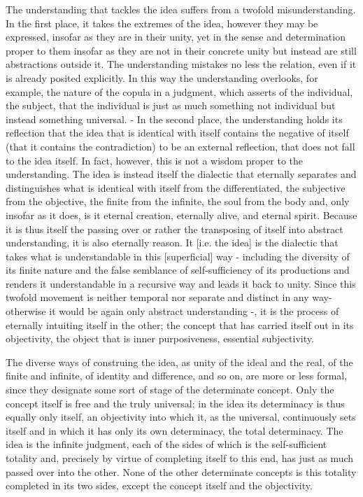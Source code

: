     The understanding that tackles the idea suffers from a twofold misunderstanding.
    In the first place, it takes the extremes of the idea,
    however they may be expressed, insofar as they are in their unity, yet
    in the sense and determination proper to them insofar as they are not
    in their concrete unity but instead are still abstractions outside it.
    The understanding mistakes no less the relation, even if it is already
    posited explicitly. In this way the understanding overlooks, for
    example, the nature of the copula in a judgment, which asserts of the
    individual, the subject, that the individual is just as much something
    not individual but instead something universal. - In the second place,
    the understanding holds its reflection that the idea that is identical
    with itself contains the negative of itself (that it contains the
    contradiction) to be an external reflection, that does not fall to the
    idea itself.
    In fact, however, this is not a wisdom proper to the understanding.
    The idea is instead itself the dialectic that eternally separates and
    distinguishes what is identical with itself from the differentiated,
    the subjective from the objective, the finite from the infinite,
    the soul from the body and, only insofar as it does, is it
    eternal creation, eternally alive, and eternal spirit.
    Because it is thus itself the passing over or rather
    the transposing of itself into abstract understanding,
    it is also eternally reason.
    It [i.e. the idea] is the dialectic that takes what is understandable
    in this [superficial] way - including the diversity of its finite nature
    and the false semblance of self-sufficiency of its productions
    and renders it understandable in a recursive way
    and leads it back to unity.
    Since this twofold movement is neither temporal nor separate and distinct in any way-
    otherwise it would be again only abstract understanding -, it is the
    process of eternally intuiting itself in the other;
    the concept that has carried itself out in its objectivity,
    the object that is inner purposiveness, essential subjectivity.

    The diverse ways of construing the idea, as unity of the ideal
    and the real, of the finite and infinite, of identity and difference,
    and so on, are more or less formal, since they designate
    some sort of stage of the determinate concept.
    Only the concept itself is free and the truly universal;
    in the idea its determinacy is thus equally only itself,
    an objectivity into which it, as the universal,
    continuously sets itself and in which it has only its own determinacy,
    the total determinacy.
    The idea is the infinite judgment, each of the
    sides of which is the self-sufficient totality and,
    precisely by virtue of completing itself to this end,
    has just as much passed over into the other.
    None of the other determinate concepts is this totality completed in its two sides,
    except the concept itself and the objectivity.

